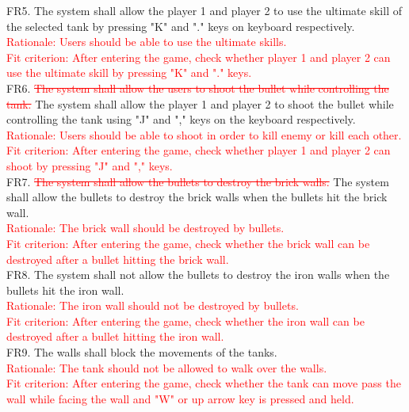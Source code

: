 \documentclass[12pt, titlepage]{article}
\begin{document}
  FR5. The system shall allow the player 1 and player 2 to use the ultimate skill of the selected tank by pressing "K" and "." keys on keyboard respectively.\\
  \textcolor{red}{Rationale: Users should be able to use the ultimate skills.\\
  Fit criterion: After entering the game, check whether player 1 and player 2 can use the ultimate skill by pressing "K" and "." keys.}\\ \newline
  FR6. \textcolor{red}{\sout{The system shall allow the users to shoot the bullet while controlling the tank.}} The system shall allow the player 1 and player 2 to shoot the bullet while controlling the tank using "J" and "," keys on the keyboard respectively.\\
  \textcolor{red}{Rationale: Users should be able to shoot in order to kill enemy or kill each other.\\
  Fit criterion: After entering the game, check whether player 1 and player 2 can shoot by pressing "J" and "," keys.}\\ \newline
  FR7. \textcolor{red}{\sout{The system shall allow the bullets to destroy the brick walls.}} The system shall allow the bullets to destroy the brick walls when the bullets hit the brick wall.\\
  \textcolor{red}{Rationale: The brick wall should be destroyed by bullets. \\
  Fit criterion: After entering the game, check whether the brick wall can be destroyed after a bullet hitting the brick wall.}\\ \newline
  FR8. The system shall not allow the bullets to destroy the iron walls when the bullets hit the iron wall.\\
  \textcolor{red}{Rationale: The iron wall should not be destroyed by bullets. \\
  Fit criterion: After entering the game, check whether the iron wall can be destroyed after a bullet hitting the iron wall.}\\ \newline
  FR9. The walls shall block the movements of the tanks.\\
  \textcolor{red}{Rationale: The tank should not be allowed to walk over the walls.\\
  Fit criterion: After entering the game, check whether the tank can move pass the wall while facing the wall and "W" or up arrow key is pressed and held.}\\ \newline
\end{document}
